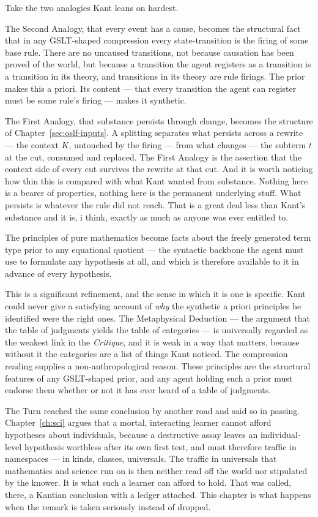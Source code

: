 Take the two analogies Kant leans on hardest.

The Second Analogy, that every event has a cause, becomes the
structural fact that in any GSLT-shaped compression every
state-transition is the firing of some base rule.
There are no uncaused transitions, not because causation has been
proved of the world, but because a transition the agent registers
as a transition is a transition in its theory, and transitions in
its theory are rule firings.
The prior makes this a priori.
Its content --- that every transition the agent can register must
be some rule's firing --- makes it synthetic.

The First Analogy, that substance persists through change, becomes
the structure of Chapter~\ref{sec:oslf-inputs}.
A splitting separates what persists across a rewrite --- the
context $K$, untouched by the firing --- from what changes --- the
subterm $t$ at the cut, consumed and replaced.
The First Analogy is the assertion that the context side of every
cut survives the rewrite at that cut.
And it is worth noticing how thin this is compared with what Kant
wanted from substance.
Nothing here is a bearer of properties, nothing here is the
permanent underlying stuff.
What persists is whatever the rule did not reach.
That is a great deal less than Kant's substance and it is, i think,
exactly as much as anyone was ever entitled to.

The principles of pure mathematics become facts about the freely
generated term type prior to any equational quotient --- the
syntactic backbone the agent must use to formulate any hypothesis
at all, and which is therefore available to it in advance of every
hypothesis.

This is a significant refinement, and the sense in which it is one
is specific.
Kant could never give a satisfying account of \emph{why} the
synthetic a priori principles he identified were the right ones.
The Metaphysical Deduction --- the argument that the table of
judgments yields the table of categories --- is universally
regarded as the weakest link in the \emph{Critique}, and it is
weak in a way that matters, because without it the categories are
a list of things Kant noticed.
The compression reading supplies a non-anthropological reason.
These principles are the structural features of any GSLT-shaped
prior, and any agent holding such a prior must endorse them
whether or not it has ever heard of a table of judgments.

The Turn reached the same conclusion by another road and said so in
passing.
Chapter~\ref{ch:sci} argues that a mortal, interacting learner
cannot afford hypotheses about individuals, because a destructive
assay leaves an individual-level hypothesis worthless after its own
first test, and must therefore traffic in namespaces --- in kinds,
classes, universals.
The traffic in universals that mathematics and science run on is
then neither read off the world nor stipulated by the knower.
It is what such a learner can afford to hold.
That was called, there, a Kantian conclusion with a ledger
attached.
This chapter is what happens when the remark is taken seriously
instead of dropped.

